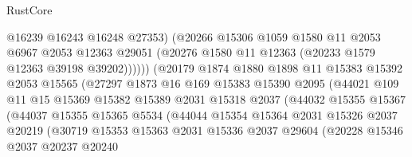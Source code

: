 \begin{lexlean}{RustCore}
\begin{coremodule}
                                @16239
                                @16243
                                @16248
                                @27353)
                              (@20266
                                @15306
                                @1059
                                @1580
                                @11
                                @2053
                                @6967
                                @2053
                                @12363
                                @29051
                                (@20276 @1580 @11 @12363 (@20233 @1579 @12363 @39198 @39202))))))
                        (@20179
                          @1874
                          @1880
                          @1898
                          @11
                          @15383
                          @15392
                          @2053
                          @15565
                          (@27297
                            @1873
                            @16
                            @169
                            @15383
                            @15390
                            @2095
                            (@44021
                              @109
                              @11
                              @15
                              @15369
                              @15382
                              @15389
                              @2031
                              @15318
                              @2037
                              (@44032
                                @15355
                                @15367
                                (@44037
                                  @15355
                                  @15365
                                  @5534
                                  (@44044
                                    @15354
                                    @15364
                                    @2031
                                    @15326
                                    @2037
                                    @20219
                                    (@30719
                                      @15353
                                      @15363
                                      @2031
                                      @15336
                                      @2037
                                      @29604
                                      (@20228
                                        @15346
                                        @2037
                                        @20237
                                        @20240

\end{coremodule}
\end{lexlean}
